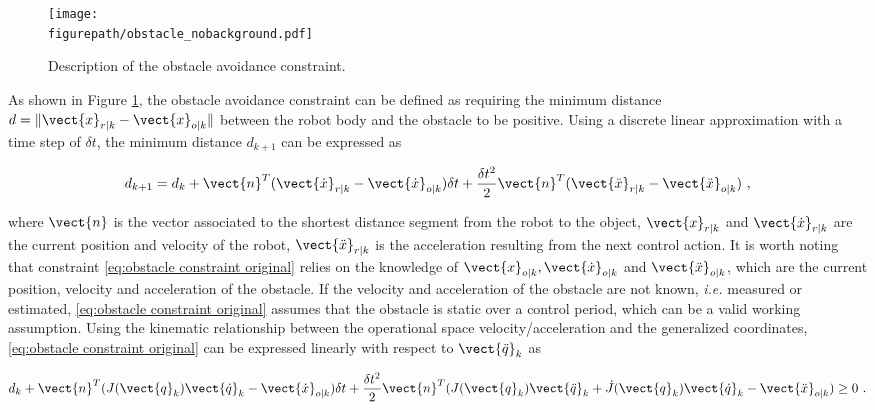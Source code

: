 \begin{figure}[!h]
\centering
\texttt{[image: \\figurepath/obstacle\_nobackground.pdf]}
\caption{Description of the obstacle avoidance constraint.}
\label{fig:scenario obstacle}
\end{figure}
As shown in Figure \ref{fig:scenario obstacle}, the obstacle avoidance constraint can be defined as requiring the minimum distance $d=\| \vect{x}_{r\vert k}-\vect{x}_{o\vert k}\|$ between the robot body and the obstacle to be positive. Using a discrete linear approximation with a time step of $\delta t$, the minimum distance $d_{k+1}$ can be expressed as
\begin{singlespace}
\begin{equation}\label{eq:obstacle constraint original}
d_{k+1} = d_{k} + \vect{n}^T(\vect{\dot{x}}_{r\vert k}-\vect{\dot{x}}_{o\vert k})\delta t + \frac{\delta t^2}{2}\vect{n}^T (\vect{\ddot{x}}_{r\vert k}-\vect{\ddot{x}}_{o\vert k}) ~,
\end{equation}
\end{singlespace}
\noindent where $\vect{n}$ is the vector associated to the shortest distance segment from the robot to the object, $\vect{x}_{r\vert k}$ and $\vect{\dot{x}}_{r\vert k}$ are the current position and velocity of the robot, $\vect{\ddot{x}}_{r\vert k}$ is the acceleration resulting from the next control action. It is worth noting that constraint \eqref{eq:obstacle constraint original} relies on the knowledge of  $\vect{x}_{o\vert k}, \vect{\dot{x}}_{o\vert k}$ and $\vect{\ddot{x}}_{o\vert k}$, which are the current position, velocity and acceleration of the obstacle. If the velocity and acceleration of the obstacle are not known, \textit{i.e.} measured or estimated, \eqref{eq:obstacle constraint original} assumes that the obstacle is static over a control period, which can be a valid working assumption. Using the kinematic relationship between the operational space velocity/acceleration and the generalized coordinates, \eqref{eq:obstacle constraint original} can be expressed linearly with respect to $\vect{\ddot{q}}_k$ as
\begin{singlespace}
\begin{equation}\label{eq:obstacle constraint}
\begin{split}
d_{k}  + \vect{n}^T(J(\vect{q}_k)\vect{\dot{q}}_k-\vect{\dot{x}}_{o\vert k})\delta t
+ \frac{\delta t^2}{2}\vect{n}^T(J(\vect{q}_k)\vect{\ddot{q}}_{k}+\dot{J}(\vect{q}_k)\vect{\dot{q}}_k-\vect{\ddot{x}}_{o\vert k})\geq 0 ~.
\end{split}
\end{equation}
\end{singlespace}


